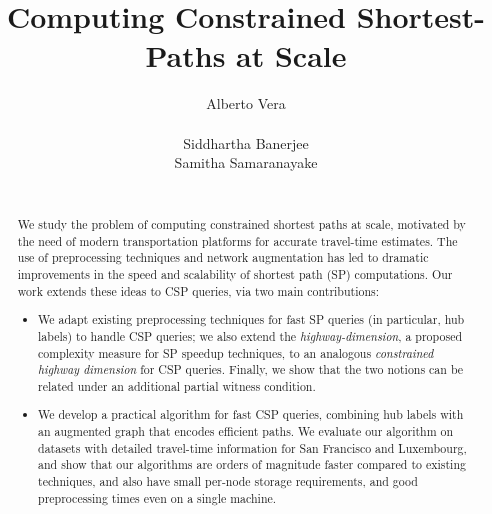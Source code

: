 \documentclass{vldb}
\begin{document}

\title{Computing Constrained Shortest-Paths at Scale}




\author{
\alignauthor
Alberto Vera\\
\\
\alignauthor
Siddhartha Banerjee
\\
\alignauthor
Samitha Samaranayake          \\               
\\
}

\maketitle

\begin{abstract}
We study the problem of computing constrained shortest paths at scale, motivated by the need of modern transportation platforms for accurate travel-time estimates. 
The use of preprocessing techniques and network augmentation has led to dramatic improvements in the speed and scalability of shortest path (SP) computations.
Our work extends these ideas to CSP queries, via two main contributions: 
\begin{itemize}[nosep,leftmargin=*]
\item We adapt existing preprocessing techniques for fast SP queries (in particular, hub labels) to handle CSP queries; we also extend the \emph{highway-dimension}, a proposed complexity measure for SP speedup techniques, to an analogous \emph{constrained highway dimension} for CSP queries.
Finally, we show that the two notions can be related under an additional partial witness condition.
\item We develop a practical algorithm for fast CSP queries, combining hub labels with an augmented graph that encodes efficient paths. We evaluate our algorithm on datasets with detailed travel-time information for San Francisco and Luxembourg, and show that our algorithms are orders of magnitude faster compared to existing techniques, and also have small per-node storage requirements, and good preprocessing times even on a single machine. 
\end{itemize}	
\end{abstract}
\end{document}
